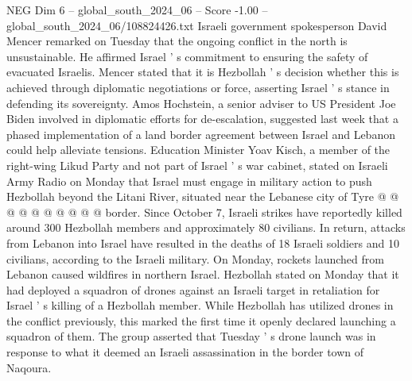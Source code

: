 \begin{textsample}{NEG Dim 6 – global\_south\_2024\_06 – Score -1.00 – global\_south\_2024\_06/108824426.txt}
Israeli government spokesperson David Mencer remarked on Tuesday that the ongoing conflict in the north is unsustainable.
He affirmed Israel ' s commitment to ensuring the safety of evacuated Israelis.
Mencer stated that it is Hezbollah ' s decision whether this is achieved through diplomatic negotiations or force, asserting Israel ' s stance in defending its sovereignty.
Amos Hochstein, a senior adviser to US President Joe Biden involved in diplomatic efforts for de-escalation, suggested last week that a phased implementation of a land border agreement between Israel and Lebanon could help alleviate tensions.
Education Minister Yoav Kisch, a member of the right-wing Likud Party and not part of Israel ' s war cabinet, stated on Israeli Army Radio on Monday that Israel must engage in military action to push Hezbollah beyond the Litani River, situated near the Lebanese city of Tyre @ @ @ @ @ @ @ @ @ @ border.
Since October 7, Israeli strikes have reportedly killed around 300 Hezbollah members and approximately 80 civilians.
In return, attacks from Lebanon into Israel have resulted in the deaths of 18 Israeli soldiers and 10 civilians, according to the Israeli military.
On Monday, rockets launched from Lebanon caused wildfires in northern Israel.
Hezbollah stated on Monday that it had deployed a squadron of drones against an Israeli target in retaliation for Israel ' s killing of a Hezbollah member.
While Hezbollah has utilized drones in the conflict previously, this marked the first time it openly declared launching a squadron of them.
The group asserted that Tuesday ' s drone launch was in response to what it deemed an Israeli assassination in the border town of Naqoura.

\end{textsample}
